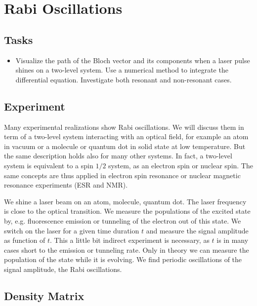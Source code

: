 

\chapter{Rabi Oscillations}



\section{Tasks}

\begin{itemize}
\item  Visualize the  path of the Bloch vector and its components when a laser pulse shines on a two-level system. Use a numerical method to integrate the differential equation. Investigate both resonant and non-resonant cases.
\end{itemize}



\section{Experiment}

Many experimental realizations show Rabi oscillations. We will discuss them in term of a two-level system interacting with an optical field, for example an atom in vacuum or a molecule or quantum dot in solid state at low temperature. But the same description holds also for many other systems. In fact, a two-level system is equivalent to a spin $1/2$ system, as an electron spin or nuclear spin. The same concepts are thus applied in electron spin resonance or nuclear magnetic resonance experiments (ESR and NMR).

We shine a laser beam on an atom, molecule, quantum dot. The laser frequency is close to the optical transition. We measure the populations of the excited state by, e.g. fluorescence emission or tunneling of the electron out of this state. We switch on the laser for a given time duration $t$ and measure the signal amplitude as function of $t$. This a little bit indirect experiment is necessary, as $t$ is in many cases short to the emission or tunneling rate. Only in theory we can measure the population of the state while it is evolving. We find periodic oscillations of the signal amplitude, the Rabi oscillations.

\section{Density Matrix}


